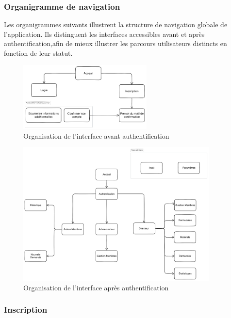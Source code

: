 \subsubsection{Organigramme de navigation}

Les organigrammes suivants illustrent la structure de navigation globale de l’application. Ils distinguent les interfaces accessibles avant et après authentification,afin de mieux illustrer les parcours utilisateurs distincts en fonction de leur statut.

\begin{figure}[H]
    \centering
    \includegraphics[width=0.6\textwidth]{images/interface/organigramme_interface_auth.png}
    \caption{Organisation de l’interface avant authentification}
    \label{fig:organigramme_non_auth}
\end{figure}

\begin{figure}[H]
    \centering
    \includegraphics[width=0.9\textwidth]{images/interface/organisation_interface.png}
    \caption{Organisation de l’interface après authentification}
    \label{fig:organigramme_auth}
\end{figure}

\subsubsection{Inscription}

